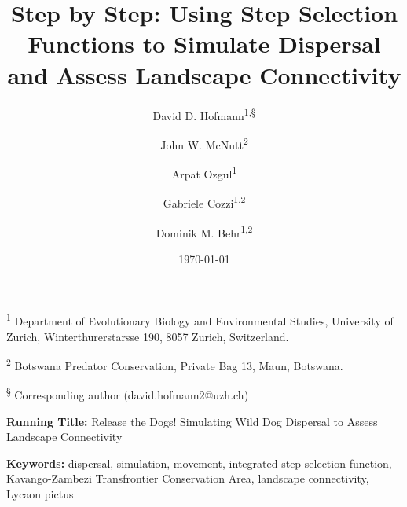 \documentclass[abstract=on,10pt,a4paper,bibliography=totocnumbered]{article}
\title{Step by Step: Using Step Selection Functions to Simulate Dispersal and
Assess Landscape Connectivity}
\author{
  David D. Hofmann\textsuperscript{1,\S} \and
  John W. McNutt\textsuperscript{2} \and
  Arpat Ozgul\textsuperscript{1} \and
  Gabriele Cozzi\textsuperscript{1,2} \and
  Dominik M. Behr\textsuperscript{1,2}
}
\date{\today}
\begin{document}



\maketitle

\begin{flushleft}

\vspace{0.5cm}

\textsuperscript{1} Department of Evolutionary Biology and Environmental
Studies, University of Zurich, Winterthurerstarsse 190, 8057 Zurich,
Switzerland.

\textsuperscript{2} Botswana Predator Conservation, Private Bag 13, Maun,
Botswana.

\textsuperscript{\S} Corresponding author (david.hofmann2@uzh.ch)

\vspace{4cm}

\textbf{Running Title:} Release the Dogs! Simulating Wild Dog Dispersal to
Assess Landscape Connectivity

\vspace{0.5cm}

\textbf{Keywords:} dispersal, simulation, movement, integrated step selection
function, Kavango-Zambezi Transfrontier Conservation Area, landscape
connectivity, Lycaon pictus

\end{flushleft}
\end{document}
